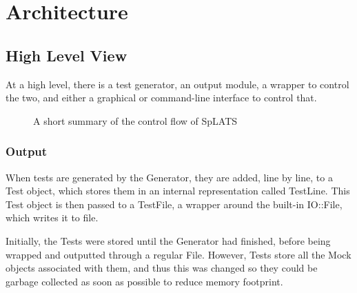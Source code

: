 \chapter{Architecture}

\section{High Level View}

  At a high level, there is a test generator, an output module, a wrapper to control the two, and either a graphical or command-line interface to control that.
\begin{center}
\begin{figure}
\caption{A short summary of the control flow of SpLATS}
\end{figure}
\end{center}

  \subsection{Output}
    When tests are generated by the Generator, they are added, line by line, to a Test object, which stores them in an internal representation called TestLine.
    This Test object is then passed to a TestFile, a wrapper around the built-in IO::File, which writes it to file.

    Initially, the Tests were stored until the Generator had finished, before being wrapped and outputted through a regular File.
    However, Tests store all the Mock objects associated with them, and thus this was changed so they could be garbage collected as soon as possible to reduce memory footprint.


